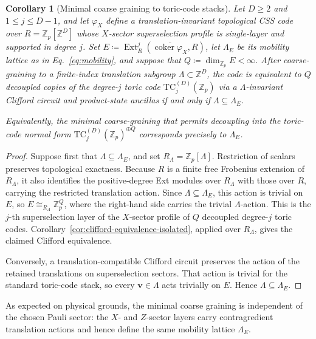 \documentclass[aps,prx,english,superscriptaddress,twocolumn,tightenlines,showpacs,longbibliography,floatfix,amsfonts]{revtex4-2}
\newtheorem{corollary}{Corollary}
\theoremstyle{remark}
\theoremstyle{definition}
\begin{document}
\begin{corollary}[Minimal coarse graining to toric-code stacks]
    \label{thm:minimal-coarse-graining}
    Let $D\geq 2$ and $1\leq j\leq D-1$, and let $\varphi_X$ define a
    translation-invariant topological CSS code over
    $R=\mathbb{Z}_p[\mathbb{Z}^D]$ whose $X$-sector superselection profile is single-layer and supported in degree $j$. Set
    $E\coloneqq
    \operatorname{Ext}_R^j(\overline{\operatorname{coker}\varphi_X},R)$,
    let $\Lambda_E$ be its mobility lattice as in
    Eq.~\eqref{eq:mobility}, and suppose that
    $Q\coloneqq\dim_{\mathbb{Z}_p}E<\infty$. After coarse-graining to a
    finite-index translation subgroup $\Lambda\subset\mathbb{Z}^D$, the code is equivalent to $Q$ decoupled copies of the degree-$j$ toric code $\mathrm{TC}_j^{(D)}(\mathbb{Z}_p)$ via a $\Lambda$-invariant Clifford circuit and product-state ancillas if and only if $\Lambda\subseteq\Lambda_E$.

    Equivalently, the minimal coarse-graining that permits decoupling into the toric-code normal form $\mathrm{TC}_j^{(D)}(\mathbb{Z}_p)^{\oplus Q}$ corresponds precisely to $\Lambda_E$.
\end{corollary}

\begin{proof}
	Suppose first that \(\Lambda\subseteq\Lambda_E\), and set
	\(R_\Lambda=\mathbb Z_p[\Lambda]\). Restriction of scalars preserves
	topological exactness. Because \(R\) is a finite free Frobenius extension
	of \(R_\Lambda\), it also identifies the positive-degree Ext modules over
	\(R_\Lambda\) with those over \(R\), carrying the restricted translation
	action. Since \(\Lambda\subseteq\Lambda_E\), this action is trivial on
	\(E\), so
	\(E\cong_{R_\Lambda}\mathbb Z_p^Q\), where the right-hand side carries
	the trivial \(\Lambda\)-action. This is the
	\(j\)-th superselection layer of the \(X\)-sector profile of \(Q\)
	decoupled degree-\(j\) toric codes.
	Corollary~\ref{cor:clifford-equivalence-isolated}, applied over
	\(R_\Lambda\), gives the claimed Clifford equivalence.

	Conversely, a translation-compatible Clifford circuit preserves the
	action of the retained translations on superselection sectors. That
	action is trivial for the standard toric-code stack, so every
	\(\mathbf v\in\Lambda\) acts trivially on \(E\). Hence
	\(\Lambda\subseteq\Lambda_E\).
\end{proof}

As expected on physical grounds, the minimal coarse graining is independent
of the chosen Pauli sector: the \(X\)- and \(Z\)-sector layers carry
contragredient translation actions and hence define the same mobility lattice
\(\Lambda_E\).
\end{document}
